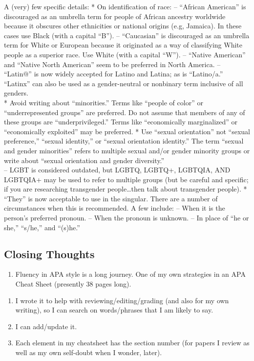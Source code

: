 \documentclass[
  11pt,
]{book}
\providecommand{\tightlist}{%
  \setlength{\itemsep}{0pt}\setlength{\parskip}{0pt}}
\begin{document}
A (very) few specific details:
* On identification of race:
-- ``African American'' is discouraged as an umbrella term for people of African ancestry worldwide because it obscures other ethnicities or national origins (e.g, Jamaica). In these cases use Black (with a capital ``B'').
-- ``Caucasian'' is discouraged as an umbrella term for White or European because it originated as a way of classifying White people as a superior race. Use White (with a capital ``W'').
-- ``Native American'' and ``Native North American'' seem to be preferred in North America.
-- ``Latin@'' is now widely accepted for Latino and Latina; as is ``Latino/a.'' ``Latinx'' can also be used as a gender-neutral or nonbinary term inclusive of all genders.\\
* Avoid writing about ``minorities.'' Terms like ``people of color'' or ``underrepresented groups'' are preferred. Do not assume that members of any of these groups are ``underprivileged.'' Terms like ``economically marginalized'' or ``economically exploited'' may be preferred.
* Use ``sexual orientation'' not ``sexual preference,'' ``sexual identity,'' or ``sexual orientation identity.'' The term ``sexual and gender minorities'' refers to multiple sexual and/or gender minority groups or write about ``sexual orientation and gender diversity.''\\
-- LGBT is considered outdated, but LGBTQ, LGBTQ+, LGBTQIA, AND LGBTQIA+ may be used to refer to multiple groups (but be careful and specific; if you are researching transgender people\ldots then talk about transgender people).
* ``They'' is now acceptable to use in the singular. There are a number of circumstances when this is recommended. A few include:
-- When it is the person's preferred pronoun.
-- When the pronoun is unknown.
-- In place of ``he or she,'' ``s/he,'' and ``(s)he.''

\hypertarget{closing-thoughts}{%
\subsection{Closing Thoughts}\label{closing-thoughts}}

\begin{enumerate}
\def\labelenumi{\arabic{enumi}.}
\tightlist
\item
  Fluency in APA style is a long journey. One of my own strategies in an APA Cheat Sheet (presently 38 pages long).
\end{enumerate}

\begin{enumerate}
\def\labelenumi{\alph{enumi}.}
\tightlist
\item
  I wrote it to help with reviewing/editing/grading (and also for my own writing), so I can search on words/phrases that I am likely to say.
\item
  I can add/update it.
\item
  Each element in my cheatsheet has the section number (for papers I review as well as my own self-doubt when I wonder, later).
\end{enumerate}
\end{document}
